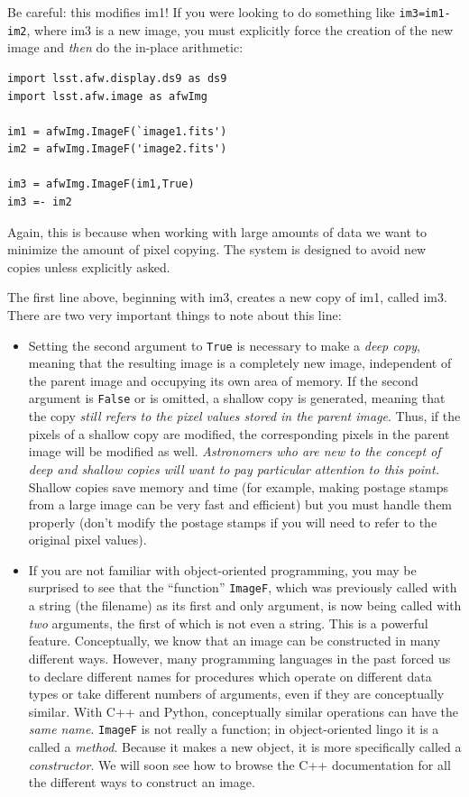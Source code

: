 Be careful: this modifies im1!  If you were looking to do something
like \texttt{im3=im1-im2}, where im3 is a new image, you must
explicitly force the creation of the new image and {\it then} do the
in-place arithmetic:

\begin{verbatim}
import lsst.afw.display.ds9 as ds9
import lsst.afw.image as afwImg

im1 = afwImg.ImageF(`image1.fits')
im2 = afwImg.ImageF('image2.fits')

im3 = afwImg.ImageF(im1,True)
im3 =- im2
\end{verbatim}

Again, this is because when working with large amounts of data we want
to minimize the amount of pixel copying.  The system is designed to
avoid new copies unless explicitly asked.

The first line above, beginning with im3, creates a new copy of im1, called im3.  There are
two very important things to note about this line:

\begin{itemize}

\item Setting the second argument to \texttt{True} is necessary to
  make a {\it deep copy}, meaning that the resulting image is a
  completely new image, independent of the parent image and occupying
  its own area of memory.  If the second argument is \texttt{False} or
  is omitted, a shallow copy is generated, meaning that the copy {\it
    still refers to the pixel values stored in the parent image}.
  Thus, if the pixels of a shallow copy are modified, the
  corresponding pixels in the parent image will be modified as well.
  {\it Astronomers who are new to the concept of deep and shallow
    copies will want to pay particular attention to this point.}
  Shallow copies save memory and time (for example, making postage
  stamps from a large image can be very fast and efficient) but you
  must handle them properly (don't modify the postage stamps if you
  will need to refer to the original pixel values).

\item If you are not familiar with object-oriented programming, you
  may be surprised to see that the ``function'' \texttt{ImageF}, which
  was previously called with a string (the filename) as its first and
  only argument, is now being called with {\it two} arguments, the
  first of which is not even a string.  This is a powerful
  feature. Conceptually, we know that an image can be constructed in
  many different ways.  However, many programming languages in the
  past forced us to declare different names for procedures which
  operate on different data types or take different numbers of
  arguments, even if they are conceptually similar.  With C++ and
  Python, conceptually similar operations can have the {\it same
    name}.  \texttt{ImageF} is not really a function; in
  object-oriented lingo it is a called a {\it method}.  Because it
  makes a new object, it is more specifically called a {\it
    constructor}.  We will soon see how to browse the C++
  documentation for all the different ways to construct an image.

\end{itemize}

